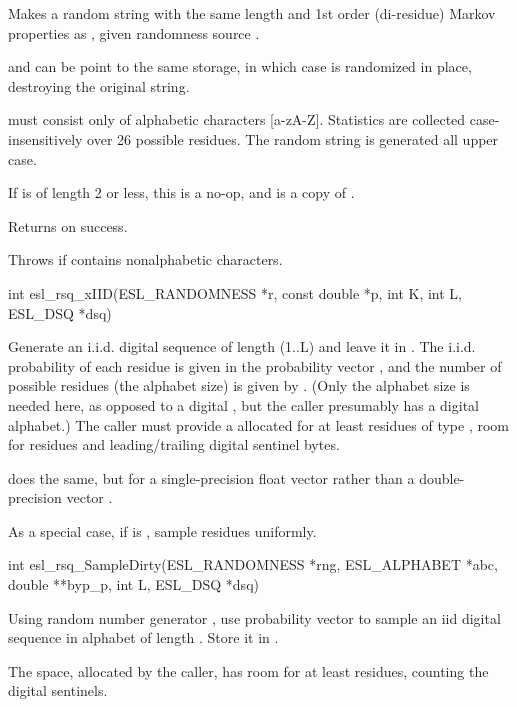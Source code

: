 \begin{sreapi}
Makes a random string  with the same length and
1st order (di-residue) Markov properties as , given
randomness source .

 and  can be point to the same storage, in which
case  is randomized in place, destroying the original
string.

 must consist only of alphabetic characters [a-zA-Z].
Statistics are collected case-insensitively over 26 possible
residues. The random string is generated all upper case.

If  is of length 2 or less, this is a no-op, and
 is a copy of .

Returns  on success.

Throws  if  contains nonalphabetic characters.


\hypertarget{func:esl_rsq_xIID()}
{\item[int esl\_rsq\_xIID(ESL\_RANDOMNESS *r, const double *p, int K, int L, ESL\_DSQ *dsq)]}

Generate an i.i.d. digital sequence of length  (1..L) and
leave it in . The i.i.d. probability of each residue is
given in the probability vector , and the number of
possible residues (the alphabet size) is given by .
(Only the alphabet size  is needed here, as opposed to
a digital , but the caller presumably
has a digital alphabet.) The caller must provide a 
allocated for at least  residues of type ,
room for  residues and leading/trailing digital sentinel bytes.

 does the same, but for a
single-precision float vector  rather than a
double-precision vector .

As a special case, if  is , sample residues uniformly.



\hypertarget{func:esl_rsq_SampleDirty()}
{\item[int esl\_rsq\_SampleDirty(ESL\_RANDOMNESS *rng, ESL\_ALPHABET *abc, double **byp\_p, int L, ESL\_DSQ *dsq)]}

Using random number generator , use probability
vector  to sample an iid digital sequence in alphabet
 of length . Store it in . 

The  space, allocated by the caller, has room for
at least  residues, counting the digital
sentinels. 


\end{sreapi}
